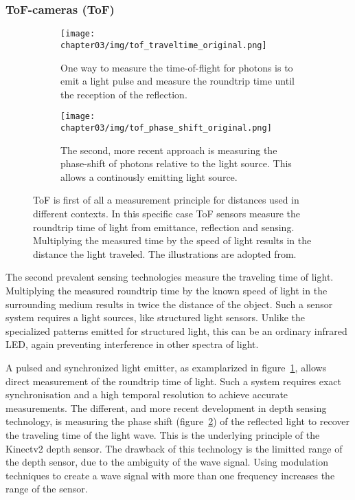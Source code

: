 \subsubsection{\acrlong{ToF}-cameras (\acrshort{ToF})}

\begin{figure}[H]
    \centering
    \begin{subfigure}[t]{0.45\textwidth}
        \texttt{[image: chapter03/img/tof\_traveltime\_original.png]}
        \caption{One way to measure the time-of-flight for photons is to emit a light pulse and measure the roundtrip time until the reception of the reflection.}\label{fig:tof_roundtrip}
    \end{subfigure}
    \begin{subfigure}[t]{0.45\textwidth}
        \texttt{[image: chapter03/img/tof\_phase\_shift\_original.png]}
        \caption{The second, more recent approach is measuring the phase-shift of photons relative to the light source. This allows a continously emitting light source.}\label{fig:tof_phase_shift}
    \end{subfigure}
    \caption[Illustration of two commonly used measuring principle for \acrshort{ToF} cameras]{\acrlong{ToF} is first of all a measurement principle for distances used in different contexts. In this specific case \acrshort{ToF} sensors measure the roundtrip time of light from emittance, reflection and sensing. Multiplying the measured time by the speed of light results in the distance the light traveled. The illustrations are adopted from\cite{tof_cameras}.}\label{fig:tof_illustration}
\end{figure}

The second prevalent sensing technologies measure the traveling time of light.
Multiplying the measured roundtrip time by the known speed of light in the surrounding medium results in twice the distance of the object.
Such a sensor system requires a light sources, like structured light sensors.
Unlike the specialized patterns emitted for structured light, this can be an ordinary infrared LED, again preventing interference in other spectra of light.

A pulsed and synchronized light emitter, as examplarized in figure~\ref{fig:tof_roundtrip}, allows direct measurement of the roundtrip time of light.
Such a system requires exact synchronisation and a high temporal resolution to achieve accurate measurements.
The different, and more recent development in depth sensing technology, is measuring the phase shift (figure~\ref{fig:tof_phase_shift}) of the reflected light to recover the traveling time of the light wave.
This is the underlying principle of the Kinectv2 depth sensor.
The drawback of this technology is the limitted range of the depth sensor, due to the ambiguity of the wave signal.
Using modulation techniques to create a wave signal with more than one frequency increases the range of the sensor.

